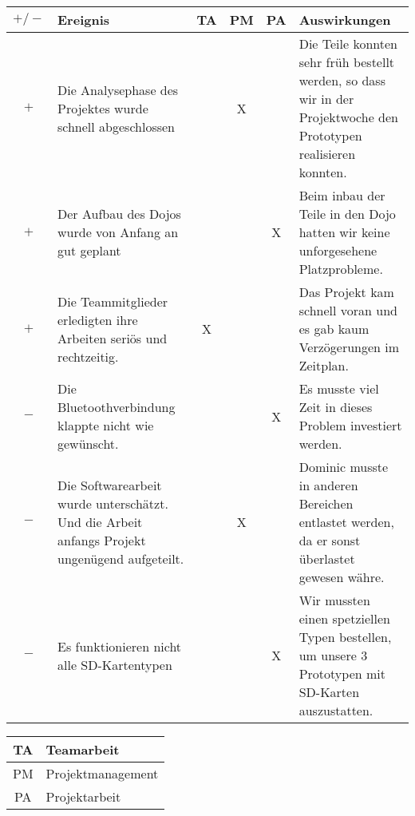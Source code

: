 \begin{center}
    \begin{tabular}{ | c | m{5.5cm} | c | c | c | m{5.5cm} |}
    \hline
    $+/-$ & Ereignis & TA & PM & PA & Auswirkungen \\ \hline
    
$+$ & Die Analysephase des Projektes wurde schnell abgeschlossen & & X & & Die Teile konnten sehr früh bestellt werden, so dass wir in der Projektwoche den Prototypen realisieren konnten. \\ \hline
    
$+$ & Der Aufbau des Dojos wurde von Anfang an gut geplant & & & X & Beim inbau der Teile in den Dojo hatten wir keine unforgesehene Platzprobleme. \\ \hline
    
$+$ & Die Teammitglieder erledigten ihre Arbeiten seriös und rechtzeitig. & X &  & & Das Projekt kam schnell voran und es gab kaum Verzögerungen im Zeitplan. \\ \hline
    
$-$ & Die Bluetoothverbindung klappte nicht wie gewünscht. & &  & X & Es musste viel Zeit in dieses Problem investiert werden.  \\ \hline
    
$-$ & Die Softwarearbeit wurde unterschätzt. Und die Arbeit anfangs Projekt ungenügend aufgeteilt. & & X & & Dominic musste in anderen Bereichen entlastet werden, da er sonst überlastet gewesen währe.  \\ \hline
    
$-$ & Es funktionieren nicht alle SD-Kartentypen & & & X & Wir mussten einen spetziellen Typen bestellen, um unsere 3 Prototypen mit SD-Karten auszustatten.  \\ \hline

    \end{tabular}
\end{center}

\begin{tabular}{ | c | l | }
    \hline
    TA & Teamarbeit \\ \hline
    PM & Projektmanagement \\ \hline
    PA & Projektarbeit \\ \hline
   
    \end{tabular}
    
    